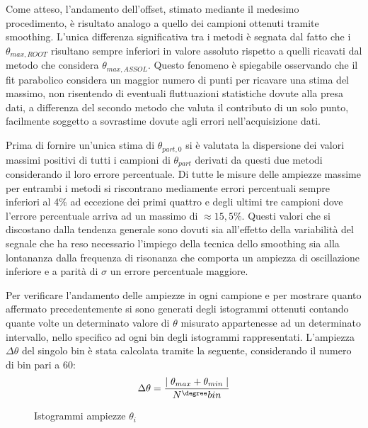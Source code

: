 \documentclass[a4paper,11pt,oneside]{article}
\begin{document}
Come atteso, l'andamento dell'offset, stimato mediante il medesimo procedimento, è risultato analogo a quello dei campioni ottenuti tramite smoothing. L'unica differenza significativa tra i metodi è segnata dal fatto che i $\theta_{max, ROOT}$ risultano sempre inferiori in valore assoluto rispetto a quelli ricavati dal metodo che considera $\theta_{max, ASSOL}$. Questo fenomeno è spiegabile osservando che il fit parabolico considera un maggior numero di punti per ricavare una stima del massimo, non risentendo di eventuali fluttuazioni statistiche dovute alla presa dati, a differenza del secondo metodo che valuta il contributo di un solo punto, facilmente soggetto a sovrastime dovute agli errori nell'acquisizione dati.\newline


Prima di fornire un'unica stima di $\theta_{part, 0}$ si è valutata la dispersione dei valori massimi positivi di tutti i campioni di $\theta_{part}$ derivati da questi due metodi considerando il loro errore percentuale. Di tutte le misure delle ampiezze massime per entrambi i metodi si riscontrano mediamente errori percentuali sempre inferiori al 4\% ad eccezione dei primi quattro e degli ultimi tre campioni dove l'errore percentuale arriva ad un massimo di $\approx 15,5\%$. Questi valori che si discostano dalla tendenza generale sono dovuti sia all'effetto della variabilità del segnale che ha reso necessario l'impiego della tecnica dello smoothing sia alla lontananza dalla frequenza di risonanza che comporta un ampiezza di oscillazione inferiore e a parità di $\sigma$ un errore percentuale maggiore.\newline

Per verificare l'andamento delle ampiezze in ogni campione e per mostrare quanto affermato precedentemente si sono generati degli istogrammi ottenuti contando quante volte un determinato valore di $\theta$ misurato appartenesse ad un determinato intervallo, nello specifico ad ogni bin degli istogrammi rappresentati. L'ampiezza $\Delta \theta$ del singolo bin è stata calcolata tramite la seguente, considerando il numero di bin pari a $60$:
\begin{equation*}
    \Delta \theta=\frac{\mid\theta_{max} + \theta_{min}\mid}{N^{\degree} bin} 
\end{equation*}

\begin{figure}[h!]
    \centering
    \caption{Istogrammi ampiezze $\theta_{i}$}
\end{figure}
\end{document}
